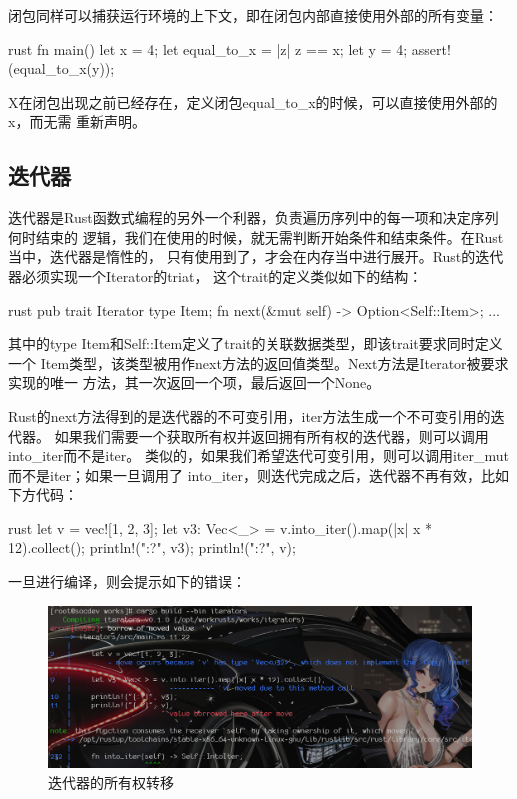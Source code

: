 闭包同样可以捕获运行环境的上下文，即在闭包内部直接使用外部的所有变量：
\begin{code-block}{rust}
fn main() {
    let x = 4;
    let equal_to_x = |z| z == x;
    let y = 4;
    assert!(equal_to_x(y));
}
\end{code-block}
X在闭包出现之前已经存在，定义闭包equal\_to\_x的时候，可以直接使用外部的x，而无需
重新声明。

\subsection{迭代器}
迭代器是Rust函数式编程的另外一个利器，负责遍历序列中的每一项和决定序列何时结束的
逻辑，我们在使用的时候，就无需判断开始条件和结束条件。在Rust当中，迭代器是惰性的，
只有使用到了，才会在内存当中进行展开。Rust的迭代器必须实现一个Iterator的triat，
这个trait的定义类似如下的结构：
\begin{code-block}{rust}
pub trait Iterator {
    type Item;
    fn next(&mut self) -> Option<Self::Item>;
    ...
}
\end{code-block}
其中的type Item和Self::Item定义了trait的关联数据类型，即该trait要求同时定义一个
Item类型，该类型被用作next方法的返回值类型。Next方法是Iterator被要求实现的唯一
方法，其一次返回一个项，最后返回一个None。

Rust的next方法得到的是迭代器的不可变引用，iter方法生成一个不可变引用的迭代器。
如果我们需要一个获取所有权并返回拥有所有权的迭代器，则可以调用into\_iter而不是iter。
类似的，如果我们希望迭代可变引用，则可以调用iter\_mut而不是iter；如果一旦调用了
into\_iter，则迭代完成之后，迭代器不再有效，比如下方代码：
\begin{code-block}{rust}
let v = vec![1, 2, 3];
let v3: Vec<_> = v.into_iter().map(|x| x * 12).collect();
println!("{:?}", v3);
println!("{:?}", v);
\end{code-block}
一旦进行编译，则会提示如下的错误：
\begin{figure}[H]
  \centering
  \includegraphics[width=\linewidth]{rust_iter_move.png}
  \caption{迭代器的所有权转移}
  \label{fig:rust_iter_move}
\end{figure}

